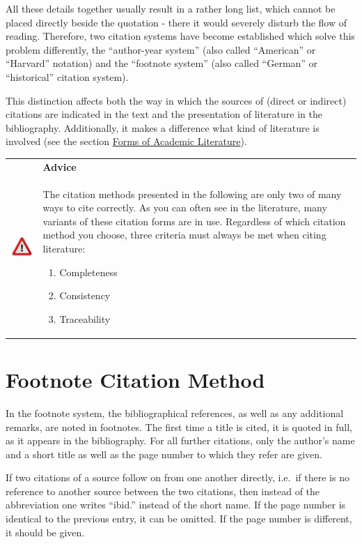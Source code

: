 \documentclass[
  english,
]{scrreprt}
\newlength{\iconwidth}
\newenvironment{displaybox}[2]{%
    \begin{center}
        \setlength\arrayrulewidth{0.75pt}%
        \arrayrulecolor{white}%
        \renewcommand{\arraystretch}{1.3}%
        \begin{tabular}{p{\iconwidth}p{\linewidth-4\tabcolsep-\iconwidth}}
            \multirow{2}{*}{#2}&\cellcolor{boxheadcol}\textbf{\sffamily\color{white}#1} \\%
            \hhline{~-}%
            &\cellcolor{boxcol}%
}{%
            \\
        \end{tabular}
        \arrayrulecolor{black}
    \end{center}
}
\newenvironment{Advice}{%
\begin{displaybox}{Advice}{\includegraphics[width=\iconwidth]{images/icon-hinweis}}}%
{\end{displaybox}}
\begin{document}
All these details together usually result in a rather long list, which cannot be placed directly beside the quotation - there it would severely disturb the flow of reading. Therefore, two citation systems have become established which solve this problem differently, the “author-year system” (also called “American” or “Harvard” notation) and the “footnote system” (also called “German” or “historical” citation system).

This distinction affects both the way in which the sources of (direct or indirect) citations are indicated in the text and the presentation of literature in the bibliography. Additionally, it makes a difference what kind of literature is involved (see the section \hyperref[sec:forms]{Forms of Academic Literature}).

\begin{Advice}

The citation methods presented in the following are only two of many ways to cite correctly. As you can often see in the literature, many variants of these citation forms are in use. Regardless of which citation method you choose, three criteria must always be met when citing literature:

\begin{enumerate}
\def\labelenumi{\arabic{enumi}.}
\item
  Completeness
\item
  Consistency
\item
  Traceability
\end{enumerate}

\end{Advice}

\section{Footnote Citation Method}\label{sec:footnote_citation}

In the footnote system, the bibliographical references, as well as any additional remarks, are noted in footnotes. The first time a title is cited, it is quoted in full, as it appears in the bibliography. For all further citations, only the author’s name and a short title as well as the page number to which they refer are given.

If two citations of a source follow on from one another directly, i.e.~if there is no reference to another source between the two citations, then instead of the abbreviation one writes “ibid.” instead of the short name. If the page number is identical to the previous entry, it can be omitted. If the page number is different, it should be given.
\end{document}
